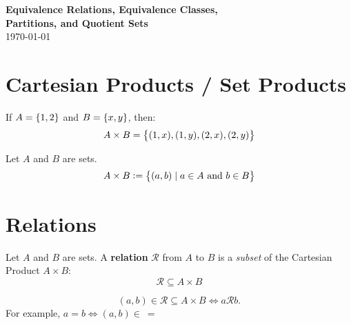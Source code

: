 \documentclass[11pt,openany]{article}
\begin{document}
\begin{center}
	\huge\textbf{Equivalence Relations, Equivalence Classes,\\ Partitions, and Quotient Sets}\\
	\vspace{0.5em}
	\vspace{0.5em}
	\normalsize{\today}\\
\end{center}

\section*{Cartesian Products / Set Products}
\begin{center}

\end{center}
\begin{example*}
	If $A=\set{1,2}$ and $B=\set{x,y}$, then: \[
	A\times B=\set{(1,x),(1,y),(2,x),(2,y)}
	\]
\end{example*}
\begin{definition*}
	Let $A$ and $B$ are sets. \[
	A\times B:=\set{(a,b)\mid a\in A\ \text{and}\ b\in B}
	\]
\end{definition*}

\section*{Relations}
\begin{center}

\end{center}
\begin{definition*}
	Let $A$ and $B$ are sets. A \textbf{relation} $\mathcal{R}$ from $A$ to $B$ is a \emph{subset} of the Cartesian Product $A\times B$: \[
	\mathcal{R}\subseteq A\times B
	\]
\end{definition*}
\begin{notation*}
	$$(a,b)\in\mathcal{R}\subseteq A\times B\iff a\mathrel{\mathcal{R}}b.$$ For example, $a=b\iff (a,b)\in\ =$
\end{notation*}
\end{document}
